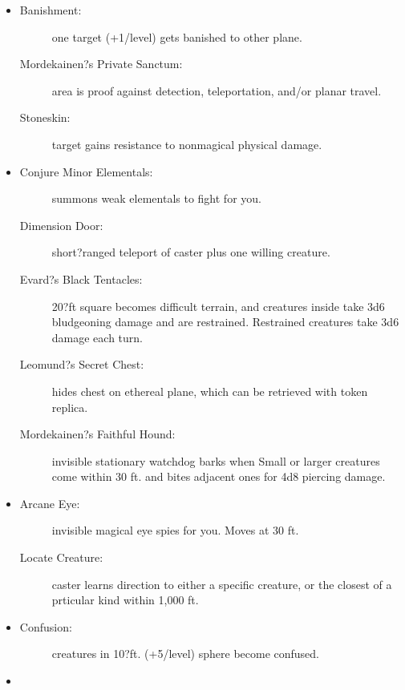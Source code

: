 \documentclass[DIV=14, paper=a4, fontsize=10pt, twocolumn, twoside]{scrartcl}
\begin{document}
\begin{itemize}[align=parleft,labelwidth=1cm]
	\renewcommand{\labelitemi}{Abjur}\item
	\begin{description}
 \item[Banishment:] one target (+1/level) gets banished to other plane.
 \item[Mordekainen?s Private Sanctum:] area is proof against detection, teleportation, and/or planar travel.
 \item[Stoneskin:] target gains resistance to nonmagical physical damage.
\end{description}
\renewcommand{\labelitemi}{Conj}\item
\begin{description}
 \item[Conjure Minor Elementals:] summons weak elementals to fight for you.
 \item[Dimension Door:] short?ranged teleport of caster plus one willing creature.
 \item[Evard?s Black Tentacles:] 20?ft square becomes difficult terrain, and creatures inside take 3d6 bludgeoning damage and are restrained. Restrained creatures take 3d6 damage each turn.
 \item[Leomund?s Secret Chest:] hides chest on ethereal plane, which can be retrieved with token replica.
 \item[Mordekainen?s Faithful Hound:] invisible stationary watchdog barks when Small or larger creatures come within 30 ft. and bites adjacent ones for 4d8 piercing damage.
\end{description}
\renewcommand{\labelitemi}{Div}\item
\begin{description}
 \item[Arcane Eye:] invisible magical eye spies for you. Moves at 30 ft.
 \item[Locate Creature:] caster learns direction to either a specific creature, or the closest of a prticular kind within 1,000 ft.
\end{description}
\renewcommand{\labelitemi}{Ench}\item
\begin{description}
 \item[Confusion:] creatures in 10?ft. (+5/level) sphere become confused.
\end{description}
\renewcommand{\labelitemi}{Evoc}\item
\begin{description}

\end{description}
\end{itemize}
\end{document}

